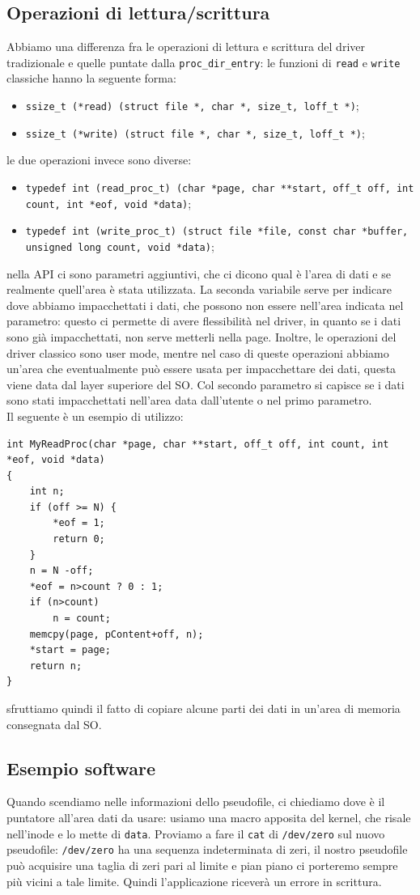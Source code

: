 \documentclass[12pt, oneside]{extbook}
\begin{document}
\subsection{Operazioni di lettura/scrittura}
Abbiamo una differenza fra le operazioni di lettura e scrittura del driver tradizionale e quelle puntate dalla \texttt{proc\_dir\_entry}: le funzioni di \texttt{read} e \texttt{write} classiche hanno la seguente forma:\\
\begin{itemize}
	\item \texttt{ssize\_t (*read) (struct file *, char *, size\_t, loff\_t *)};
	\item \texttt{ssize\_t (*write) (struct file *, char *, size\_t, loff\_t *)};
\end{itemize}
le due operazioni invece sono diverse:
\begin{itemize}
	\item \texttt{typedef int (read\_proc\_t) (char *page, char **start, off\_t off, int count, int *eof, void *data)};
	\item \texttt{typedef int (write\_proc\_t) (struct file *file, const char *buffer, unsigned long count, void *data)};
\end{itemize}
nella API ci sono parametri aggiuntivi, che ci dicono qual è l'area di dati e se realmente quell'area è stata utilizzata. La seconda variabile serve per indicare dove abbiamo impacchettati i dati, che possono non essere nell'area indicata nel parametro: questo ci permette di avere flessibilità nel driver, in quanto se i dati sono già impacchettati, non serve metterli nella page. Inoltre, le operazioni del driver classico sono user mode, mentre nel caso di queste operazioni abbiamo un'area che eventualmente può essere usata per impacchettare dei dati, questa viene data dal layer superiore del SO. Col secondo parametro si capisce se i dati sono stati impacchettati nell'area data dall'utente o nel primo parametro.\\Il seguente è un esempio di utilizzo:
\begin{lstlisting}
int MyReadProc(char *page, char **start, off_t off, int count, int *eof, void *data)
{
	int n;
	if (off >= N) {
		*eof = 1;
		return 0;
	}
	n = N -off;
	*eof = n>count ? 0 : 1;
	if (n>count)
		n = count;
	memcpy(page, pContent+off, n);
	*start = page;
	return n;
}
\end{lstlisting}
sfruttiamo quindi il fatto di copiare alcune parti dei dati in un'area di memoria consegnata dal SO.
\subsection*{Esempio software}
Quando scendiamo nelle informazioni dello pseudofile, ci chiediamo dove è il puntatore all'area dati da usare: usiamo una macro apposita del kernel, che risale nell'inode e lo mette di \texttt{data}. Proviamo a fare il \texttt{cat} di \texttt{/dev/zero} sul nuovo pseudofile: \texttt{/dev/zero} ha una sequenza indeterminata di zeri, il nostro pseudofile può acquisire una taglia di zeri pari al limite e pian piano ci porteremo sempre più vicini a tale limite. Quindi l'applicazione riceverà un errore in scrittura.
\end{document}
